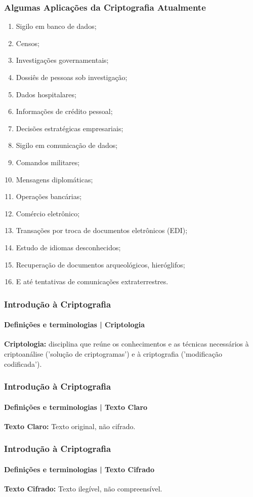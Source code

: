 \documentclass[compress]{beamer}
\begin{document}
\begin{frame}
\frametitle{Algumas Aplicações da Criptografia Atualmente}
		\begin{enumerate}
			\item{Sigilo em banco de dados;}
			\item{Censos;}
			\item{Investigações governamentais;}
			\item{Dossiês de pessoas sob investigação;}
			\item{Dados hospitalares;}
			\item{Informações de crédito pessoal;}
			\item{Decisões estratégicas empresariais;}
			\item{Sigilo em comunicação de dados;}
			\item{Comandos militares;}
			\item{Mensagens diplomáticas;}
			\item{Operações bancárias;}
			\item{Comércio eletrônico;}
			\item{Transações por troca de documentos eletrônicos (EDI);}
			\item{Estudo de idiomas desconhecidos;}
			\item{Recuperação de documentos arqueológicos, hieróglifos;}
			\item{E até tentativas de comunicações extraterrestres.}
		\end{enumerate}
\end{frame}

\begin{frame}
\frametitle{Introdução à Criptografia}
\framesubtitle{Definições e terminologias | Criptologia}
\justifying
	\textbf{Criptologia:} disciplina que reúne os conhecimentos e as técnicas necessários à criptoanálise ('solução de criptogramas') e à criptografia ('modificação codificada').
\end{frame}

\begin{frame}
\frametitle{Introdução à Criptografia}
\framesubtitle{Definições e terminologias | Texto Claro}
\justifying
\textbf{Texto Claro:} Texto original, não cifrado.
\end{frame}

\begin{frame}
\frametitle{Introdução à Criptografia}
\framesubtitle{Definições e terminologias | Texto Cifrado}
\justifying
\textbf{Texto Cifrado:} Texto ilegível, não compreensível.
\end{frame}
\end{document}
